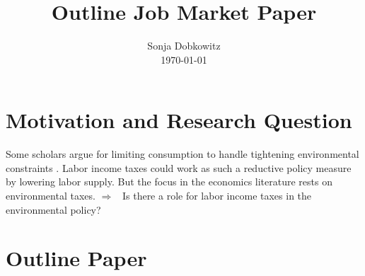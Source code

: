 \documentclass[12pt]{article}
\title{Outline Job Market Paper}
\date{\vspace{-10mm} Sonja Dobkowitz %
\\ \today }
\newcommand{\ar}{$\Rightarrow$ \ }
\begin{document}
	\maketitle
	\section{Motivation and Research Question}
		Some scholars argue for limiting consumption to handle tightening environmental constraints \citep{Schor2005SustainableReductionb, VanVuuren2018AlternativeTechnologies}. Labor income taxes could work as such a reductive policy measure by lowering labor supply.
		But the focus in the economics literature rests on environmental taxes. 
\ar Is there a role for labor income taxes in the environmental policy?

\section{Outline Paper}
\end{document}
